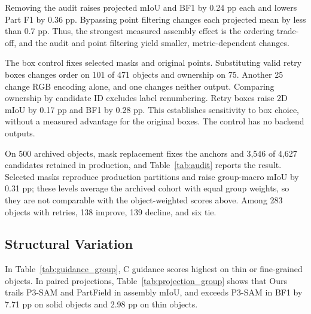 \documentclass[pdflatex,sn-mathphys-ay]{sn-jnl}
\begin{document}
Removing the audit raises projected mIoU and BF1 by 0.24 pp each and lowers Part F1 by 0.36 pp. Bypassing point filtering changes each projected mean by less than 0.7 pp. Thus, the strongest measured assembly effect is the ordering trade-off, and the audit and point filtering yield smaller, metric-dependent changes.

The box control fixes selected masks and original points. Substituting valid retry boxes changes order on 101 of 471 objects and ownership on 75. Another 25 change RGB encoding alone, and one changes neither output. Comparing ownership by candidate ID excludes label renumbering. Retry boxes raise 2D mIoU by 0.17 pp and BF1 by 0.28 pp. This establishes sensitivity to box choice, without a measured advantage for the original boxes. The control has no backend outputs.

On 500 archived objects, mask replacement fixes the anchors and 3,546 of 4,627 candidates retained in production, and Table~\ref{tab:audit} reports the result. Selected masks reproduce production partitions and raise group-macro mIoU by 0.31 pp; these levels average the archived cohort with equal group weights, so they are not comparable with the object-weighted scores above. Among 283 objects with retries, 138 improve, 139 decline, and six tie.

\subsection{Structural Variation}\label{sec:structural_analysis}
In Table~\ref{tab:guidance_group}, C guidance scores highest on thin or fine-grained objects. In paired projections, Table~\ref{tab:projection_group} shows that Ours trails P3-SAM and PartField in assembly mIoU, and exceeds P3-SAM in BF1 by 7.71 pp on solid objects and 2.98 pp on thin objects.
\end{document}
